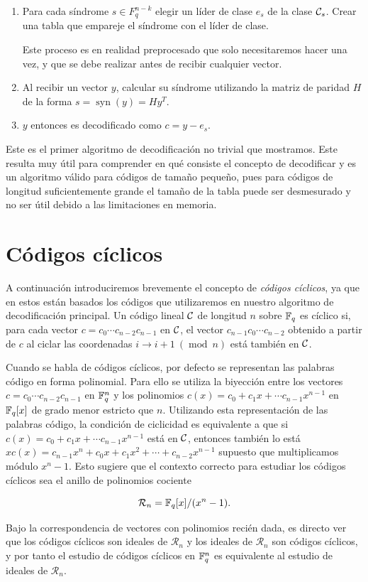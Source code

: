 \begin{enumerate}
    \item Para cada síndrome \(s \in F_q^{n-k}\) elegir un líder de clase \(e_s\) de la clase \(\mathcal{C}_s\). Crear una tabla que empareje el síndrome con el líder de clase.

    Este proceso es en realidad preprocesado que solo necesitaremos hacer una vez, y que se debe realizar antes de recibir cualquier vector.
    \item Al recibir un vector \(y\), calcular su síndrome utilizando la matriz de paridad \(H\) de la forma \(s = \operatorname{syn}(y) = Hy^{T}\).
    \item \(y\) entonces es decodificado como \(c = y - e_s\).
\end{enumerate}

Este es el primer algoritmo de decodificación no trivial que mostramos. Este resulta muy útil para comprender en qué consiste el concepto de decodificar y es un algoritmo válido para códigos de tamaño pequeño, pues para códigos de longitud suficientemente grande el tamaño de la tabla puede ser desmesurado y no ser útil debido a las limitaciones en memoria.

\section{Códigos cíclicos}
\label{sec:códigos_cíclicos}

A continuación introduciremos brevemente el concepto de \textit{códigos cíclicos}, ya que en estos están basados los códigos que utilizaremos en nuestro algoritmo de decodificación principal. Un código lineal \(\mathcal{C}\) de longitud \(n\) sobre \(\mathbb{F}_q\) es cíclico si, para cada vector \(c = c_0\cdots c_{n-2}c_{n-1}\) en \(\mathcal{C}\), el vector \(c_{n-1}c_{0}\cdots c_{n-2}\) obtenido a partir de \(c\) al ciclar las coordenadas \(i \to i+1\ (\operatorname{mod}\ n)\) está también en \(\mathcal{C}\).

Cuando se habla de códigos cíclicos, por defecto se representan las palabras código en forma polinomial. Para ello se utiliza la biyección entre los vectores \(c = c_0\cdots c_{n-2}c_{n-1}\) en \(\mathbb{F}_q^{n}\) y los polinomios \(c(x) = c_0 + c_1x + \cdots c_{n-1}x^{n-1}\) en \(\mathbb{F}_q[x]\) de grado menor estricto que \(n\). Utilizando esta representación de las palabras código, la condición de ciclicidad es equivalente a que si \(c(x) = c_0 + c_1x + \cdots c_{n-1}x^{n-1}\) está en \(\mathcal{C}\), entonces también lo está \(xc(x) = c_{n-1}x^{n} + c_{0}x + c_1x^{2} + \cdots + c_{n-2}x^{n-1}\) supuesto que multiplicamos módulo \(x^{n} - 1\). Esto sugiere que el contexto correcto para estudiar los códigos cíclicos sea el anillo de polinomios cociente

\[
\mathcal{R}_n = \mathbb{F}_q[x]/(x^{n} - 1)
.\]

Bajo la correspondencia de vectores con polinomios recién dada, es directo ver que los códigos cíclicos son ideales de \(\mathcal{R}_n\) y los ideales de \(\mathcal{R}_n\) son códigos cíclicos, y por tanto el estudio de códigos cíclicos en \(\mathbb{F}_q^{n}\) es equivalente al estudio de ideales de \(\mathcal{R}_n\).
